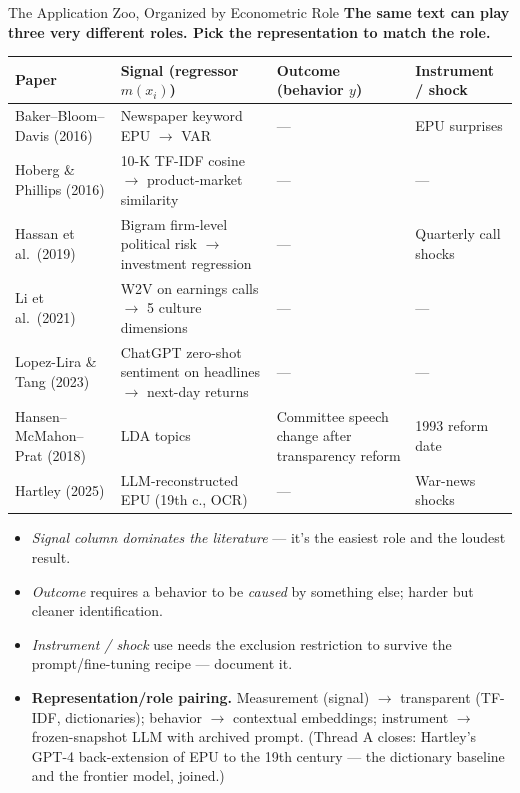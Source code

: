 \begin{frame}{The Application Zoo, Organized by Econometric Role}
\textbf{The same text can play three very different roles. Pick the representation to match the role.}
\medskip

\begin{center}
\renewcommand{\arraystretch}{1.25}
\scriptsize
\begin{tabular}{|p{3.2cm}|p{3.7cm}|p{3.5cm}|p{3.2cm}|}
\hline
\textbf{Paper} & \textbf{Signal (regressor $m(x_i)$)} & \textbf{Outcome (behavior $y$)} & \textbf{Instrument / shock} \\
\hline
Baker--Bloom--Davis (2016) & Newspaper keyword EPU $\to$ VAR & --- & EPU surprises \\
\hline
Hoberg \& Phillips (2016) & 10-K TF-IDF cosine $\to$ product-market similarity & --- & --- \\
\hline
Hassan et al.\ (2019) & Bigram firm-level political risk $\to$ investment regression & --- & Quarterly call shocks \\
\hline
Li et al.\ (2021) & W2V on earnings calls $\to$ 5 culture dimensions & --- & --- \\
\hline
Lopez-Lira \& Tang (2023) & ChatGPT zero-shot sentiment on headlines $\to$ next-day returns & --- & --- \\
\hline
Hansen--McMahon--Prat (2018) & LDA topics & Committee speech change after transparency reform & 1993 reform date \\
\hline
Hartley (2025) & LLM-reconstructed EPU (19th c., OCR) & --- & War-news shocks \\
\hline
\end{tabular}
\end{center}

\smallskip
\footnotesize
\begin{itemize}\itemsep0pt
\item \emph{Signal column dominates the literature} --- it's the easiest role and the loudest result.
\item \emph{Outcome} requires a behavior to be \emph{caused} by something else; harder but cleaner identification.
\item \emph{Instrument / shock} use needs the exclusion restriction to survive the prompt/fine-tuning recipe --- document it.
\item \textbf{Representation/role pairing.} Measurement (signal) $\to$ transparent (TF-IDF, dictionaries); behavior $\to$ contextual embeddings; instrument $\to$ frozen-snapshot LLM with archived prompt. (Thread A closes: Hartley's GPT-4 back-extension of EPU to the 19th century --- the dictionary baseline and the frontier model, joined.)
\end{itemize}
\end{frame}

